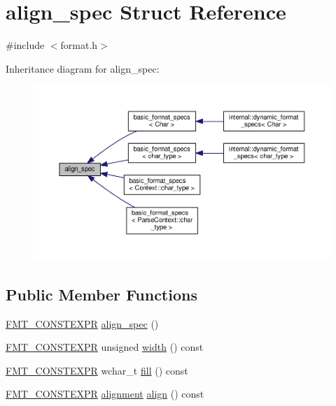 \hypertarget{structalign__spec}{}\section{align\+\_\+spec Struct Reference}
\label{structalign__spec}


{\ttfamily \#include $<$format.\+h$>$}



Inheritance diagram for align\+\_\+spec\+:
\nopagebreak
\begin{figure}[H]
\begin{center}
\leavevmode
\includegraphics[width=350pt]{structalign__spec__inherit__graph}
\end{center}
\end{figure}
\subsection*{Public Member Functions}
\begin{DoxyCompactItemize}
\item 
\hyperlink{core_8h_a69201cb276383873487bf68b4ef8b4cd}{F\+M\+T\+\_\+\+C\+O\+N\+S\+T\+E\+X\+PR} \hyperlink{structalign__spec_ac4bda09e8d5c54631bf9dc29be445c4a}{align\+\_\+spec} ()
\item 
\hyperlink{core_8h_a69201cb276383873487bf68b4ef8b4cd}{F\+M\+T\+\_\+\+C\+O\+N\+S\+T\+E\+X\+PR} unsigned \hyperlink{structalign__spec_a863232f1045d21017ffcd7c498c58c3d}{width} () const
\item 
\hyperlink{core_8h_a69201cb276383873487bf68b4ef8b4cd}{F\+M\+T\+\_\+\+C\+O\+N\+S\+T\+E\+X\+PR} wchar\+\_\+t \hyperlink{structalign__spec_aa32e6aa1f46445d0d0d4f7dadbba9e21}{fill} () const
\item 
\hyperlink{core_8h_a69201cb276383873487bf68b4ef8b4cd}{F\+M\+T\+\_\+\+C\+O\+N\+S\+T\+E\+X\+PR} \hyperlink{format_8h_a5460ac1c70db05be4ec2268f463ea981}{alignment} \hyperlink{structalign__spec_a538c770bce8dfea8510e1ff82e62e2ac}{align} () const
\end{DoxyCompactItemize}
